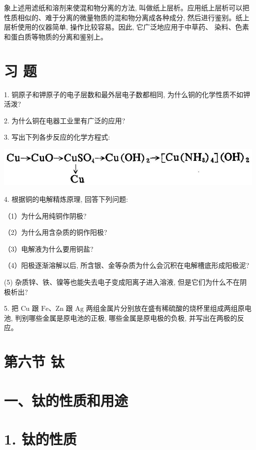 \documentclass[10pt]{article}
\begin{document}
象上述用滤纸和溶剂来使混和物分离的方法, 叫做纸上层析。应用纸上层析可以把性质相似的、难于分离的微量物质的混和物分离成各种成分, 然后进行鉴别。纸上层析使用的仪器简单, 操作比较容易。因此, 它广泛地应用于中草药、 染料、色素和蛋白质等物质的分离和鉴别上。

\section*{习 题}

1. 铜原子和钾原子的电子层数和最外层电子数都相同, 为什么铜的化学性质不如钾活泼?

2. 为什么铜在电器工业里有广泛的应用?

3. 写出下列各步反应的化学方程式:

\begin{center}
\includegraphics[max width=1.0\textwidth]{images/01912d16-be99-77bb-9535-4f3ed8d9946f_39_787468.jpg}
\end{center}

4. 根据铜的电解精炼原理, 回答下列问题:

（1）为什么用纯铜作阴极?

（2）为什么用含杂质的铜作阳极?

（3）电解液为什么要用铜盐?

（4）阳极逐渐溶解以后, 所含银、金等杂质为什么会沉积在电解槽底形成阳极泥?

(5) 杂质锌、铁、镍等也能失去电子变成阳离子进入溶液, 但是它们为什么不在阴极析出?

5. 把 \(\mathrm{{Cu}}\) 跟 \(\mathrm{{Fe}}\text{、}\mathrm{{Zn}}\) 跟 \(\mathrm{{Ag}}\) 两组金属片分别放在盛有稀硫酸的烧杯里组成两组原电池, 判别哪些金属是原电池的正极, 哪些金属是原电极的负极, 并写出在两极的反应。

\section*{第六节 钛}

\section*{一、钛的性质和用途}

\section*{1. 钛的性质}
\end{document}
